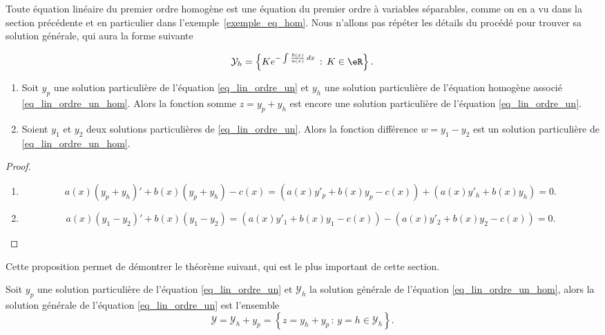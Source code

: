 Toute équation linéaire du premier ordre homogène est une équation du premier ordre à variables séparables, comme on en a vu dans la section précédente et en particulier dans l'exemple~\ref{exemple_eq_hom}. Nous n'allons pas répéter les détails du procédé pour trouver sa solution générale, qui aura la forme suivante
\begin{Aretenir}
  \begin{equation}\label{solgeneqlinordre1}
    \mathcal{Y}_h=\left\{Ke^{-\int\frac{b(x)}{a(x)}\, dx}\,:\, K\in\eR\right\}.
  \end{equation}
\end{Aretenir}
\begin{proposition}
  \begin{enumerate}
  \item Soit $y_p$ une solution particulière de l'équation \eqref{eq_lin_ordre_un} et $y_h$ une solution particulière de l'équation homogène associé \eqref{eq_lin_ordre_un_hom}. Alors la fonction somme $z= y_p+y_h$ est encore une solution particulière de l'équation \eqref{eq_lin_ordre_un}.
  \item Soient $y_1$ et $y_2$ deux solutions particulières de \eqref{eq_lin_ordre_un}. Alors la fonction différence $w = y_1-y_2$ est un solution particulière de \eqref{eq_lin_ordre_un_hom}.
  \end{enumerate}
\end{proposition}
\begin{proof}
  \begin{enumerate}
  \item
    \begin{equation}
      a(x)\left(y_p+y_h\right)' + b(x)\left(y_p+y_h\right)-c(x)  =\left( a(x)y'_p+ b(x)y_p-c(x)\right) + \left( a(x)y'_h+ b(x)y_h\right) = 0.
    \end{equation}
  \item
    \begin{equation}
      a(x)\left(y_1-y_2\right)' + b(x)\left(y_1-y_2\right) =\left( a(x)y'_1+ b(x)y_1-c(x)\right) -\left( a(x)y'_2+ b(x)y_2-c(x)\right) = 0.
    \end{equation}
  \end{enumerate}
\end{proof}
Cette proposition permet de démontrer le théorème suivant, qui est le plus important de cette section.
\begin{theorem}
  Soit $y_p$ une solution particulière de l'équation \eqref{eq_lin_ordre_un} et $\mathcal{Y}_h$ la solution générale de l'équation \eqref{eq_lin_ordre_un_hom}, alors la solution générale de l'équation \eqref{eq_lin_ordre_un} est l'ensemble
  \begin{equation}
    \mathcal{Y} = \mathcal{Y}_h +y_p = \left\{z= y_h + y_p\,:\, y=h \in\mathcal{Y}_h \right\}.
  \end{equation}
\end{theorem}
